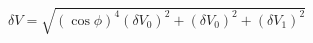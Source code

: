 \begin{equation}
\label{eq:delta_V_Malus}
\delta V = \sqrt{ \left(\cos{\phi}\right)^4(\delta V_0)^2 + (\delta V_0)^2+ (\delta V_1)^2}
\end{equation}